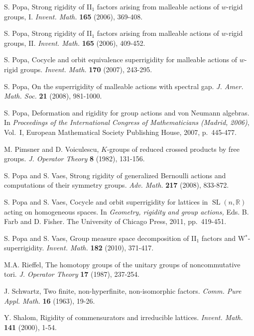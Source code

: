 \documentclass[a4paper,11pt]{amsart}
\numberwithin{equation}{section}
\begin{document}
\begin{thebibliography}{ABC90}
 {S. Popa}, Strong rigidity of II$_1$ factors arising from malleable actions of $w$-rigid groups, I. \emph{Invent. Math.} \textbf{165} (2006), 369-408.

 {S. Popa}, Strong rigidity of II$_1$ factors
arising from malleable actions of $w$-rigid groups, II. {\it Invent.
Math.} {\bf 165} (2006), 409-452.

 {S. Popa}, Cocycle and orbit equivalence superrigidity
for malleable actions of $w$-rigid groups. {\it Invent. Math.} {\bf 170} (2007), 243-295.

 {S. Popa}, On the superrigidity of malleable actions with spectral gap.
{\it J. Amer. Math. Soc.} {\bf 21} (2008), 981-1000.

 {S. Popa}, Deformation and rigidity for group actions and von Neumann algebras. In {\it Proceedings of the International Congress of Mathematicians (Madrid, 2006)}, Vol.\ I, European Mathematical Society Publishing House, 2007, p.\ 445-477.

 M. Pimsner and D. Voiculescu,
$K$-groups of reduced crossed products by free groups.
{\it J. Operator Theory} {\bf 8} (1982), 131-156.

 {S. Popa and S. Vaes}, Strong rigidity of
generalized Bernoulli actions and computations of their symmetry
groups. {\it Adv. Math.} {\bf 217} (2008), 833-872.

 {S. Popa and S. Vaes}, Cocycle and orbit superrigidity for lattices in ${\operatorname{SL}}(n,{\mathbb{R}})$ acting on homogeneous spaces.
In {\it Geometry, rigidity and group actions,} Eds. B. Farb and D. Fisher. The University of Chicago Press, 2011, pp.\ 419-451.

 {S. Popa and S. Vaes}, Group measure space decomposition of II$_1$ factors and W$^*$-superrigidity. {\it Invent. Math.} {\bf 182} (2010), 371-417.

 {M.A. Rieffel},
The homotopy groups of the unitary groups of noncommutative tori.
{\it J. Operator Theory} {\bf 17} (1987), 237-254.

 {J. Schwartz}, Two finite, non-hyperfinite, non-isomorphic factors.
{\it Comm. Pure Appl. Math.} {\bf 16} (1963), 19-26.

 {Y. Shalom}, Rigidity of commensurators and irreducible lattices.
{\it Invent. Math.} {\bf 141} (2000), 1-54.


\end{thebibliography}
\end{document}
